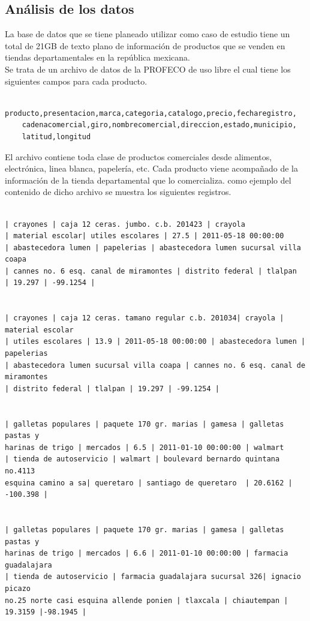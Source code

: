 \subsection{Análisis de los datos} \label{datosagrupados}
La base de datos que se tiene planeado utilizar como caso de estudio tiene un total de 21GB de texto plano de información de productos que se venden en tiendas departamentales en la república mexicana. 
\\
Se trata de un archivo de datos de la PROFECO de uso libre el cual tiene los siguientes campos para cada producto.
\begin{lstlisting} 
	producto,presentacion,marca,categoria,catalogo,precio,fecharegistro,
	cadenacomercial,giro,nombrecomercial,direccion,estado,municipio,
	latitud,longitud
\end{lstlisting}
El archivo contiene toda clase de productos comerciales desde alimentos, electrónica, linea blanca, papelería, etc. 
Cada producto viene acompañado de la información de la tienda departamental que lo comercializa.
como ejemplo del contenido de dicho archivo se muestra los siguientes registros.
\begin{lstlisting} 

| crayones | caja 12 ceras. jumbo. c.b. 201423 | crayola 
| material escolar| utiles escolares | 27.5 | 2011-05-18 00:00:00 
| abastecedora lumen | papelerias | abastecedora lumen sucursal villa coapa 
| cannes no. 6 esq. canal de miramontes | distrito federal | tlalpan 
| 19.297 | -99.1254 |


| crayones | caja 12 ceras. tamano regular c.b. 201034| crayola | material escolar 
| utiles escolares | 13.9 | 2011-05-18 00:00:00 | abastecedora lumen | papelerias 
| abastecedora lumen sucursal villa coapa | cannes no. 6 esq. canal de miramontes 
| distrito federal | tlalpan | 19.297 | -99.1254 |


| galletas populares | paquete 170 gr. marias | gamesa | galletas pastas y 
harinas de trigo | mercados | 6.5 | 2011-01-10 00:00:00 | walmart 
| tienda de autoservicio | walmart | boulevard bernardo quintana no.4113 
esquina camino a sa| queretaro | santiago de queretaro  | 20.6162 | -100.398 |


| galletas populares | paquete 170 gr. marias | gamesa | galletas pastas y 
harinas de trigo | mercados | 6.6 | 2011-01-10 00:00:00 | farmacia guadalajara 
| tienda de autoservicio | farmacia guadalajara sucursal 326| ignacio picazo 
no.25 norte casi esquina allende ponien | tlaxcala | chiautempan | 19.3159 |-98.1945 |
\end{lstlisting}
